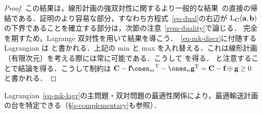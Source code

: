 \begin{proof}
この結果は，線形計画の強双対性に関するより一般的な結果~\citep[p. 148, Theo. 4.4]{bertsimas1997introduction}の直接の帰結である．証明のより容易な部分，すなわち方程式~\eqref{eq-dual}の右辺が $\mathrm{L}_{\mathrm{\textbf{C}}}(\mathrm{\textbf{a}},\mathrm{\textbf{b}})$ の下界であることを確立する部分は，次節の注意~\ref{rem-duality}で論じる．
%
完全を期すため，Lagrange 双対性を用いて結果を導こう．~\eqref{eq-mk-discr}に付随する Lagrangian は
と書かれる．上記の min と max を入れ替える．これは線形計画（有限次元）を考える際には常に可能である．こうして
を得る．
と注意することで結論を得る．こうして制約は $\C - \fD\transp{\ones_m} - \ones_n \transp{\gD} = \C-\fD\oplus \gD \geq 0$ と書かれる．
\end{proof}

Lagrangian~\eqref{eq-mk-lagr}の主問題・双対問題の最適性関係により，最適輸送計画の台を特定できる（\S\ref{s-complementary}も参照）．


